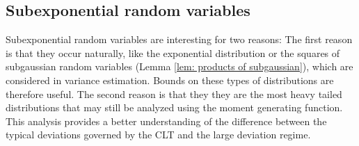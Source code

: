 \subsection{Subexponential random variables}

Subexponential random variables are interesting for two reasons:
The first reason is that they occur naturally, like the exponential distribution or
the squares of subgaussian random variables (Lemma \ref{lem: products of
subgaussian}), which are considered in variance estimation. Bounds on these types
of distributions are therefore useful. The second reason
is that they they are the most heavy tailed distributions that may still be
analyzed using the moment generating function. This analysis provides a better
understanding of the difference between the typical deviations governed by the
CLT and the large deviation regime.

